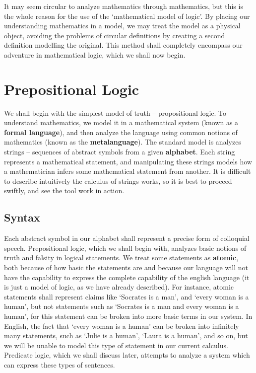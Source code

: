 It may seem circular to analyze mathematics through mathematics, but this is the whole reason for the use of the `mathematical model of logic'. By placing our understanding mathematics in a model, we may treat the model as a physical object, avoiding the problems of circular definitions by creating a second definition modelling the original. This method shall completely encompass our adventure in mathematical logic, which we shall now begin.



\chapter{Prepositional Logic}

We shall begin with the simplest model of truth -- propositional logic. To understand mathematics, we model it in a mathematical system (known as a {\bf formal language}), and then analyze the language using common notions of mathematics (known as the {\bf metalanguage}). The standard model is analyzes strings -- sequences of abstract symbols from a given {\bf alphabet}. Each string represents a mathematical statement, and manipulating these strings models how a mathematician infers some mathematical statement from another. It is difficult to describe intuitively the calculus of strings works, so it is best to proceed swiftly, and see the tool work in action.

\section{Syntax}

Each abstract symbol in our alphabet shall represent a precise form of colloquial speech. Prepositional logic, which we shall begin with, analyzes basic notions of truth and falsity in logical statements. We treat some statements as {\bf atomic}, both because of how basic the statements are and because our language will not have the capability to express the complete capability of the english language (it is just a model of logic, as we have already described). For instance, atomic statements shall represent claims like `Socrates is a man', and `every woman is a human', but not statements such as `Socrates is a man and every woman is a human', for this statement can be broken into more basic terms in our system. In English, the fact that `every woman is a human' can be broken into infinitely many statements, such as `Julie is a human', `Laura is a human', and so on, but we will be unable to model this type of statement in our current calculus. Predicate logic, which we shall discuss later, attempts to analyze a system which can express these types of sentences.

